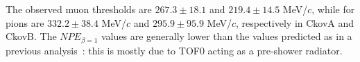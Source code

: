 The observed muon thresholds are $267.3\pm18.1$ and $219.4\pm14.5$ MeV/$c$, while for pions are $332.2\pm38.4$ MeV/$c$ and $295.9\pm95.9$ MeV/$c$, respectively in CkovA and CkovB. The $NPE_{\beta=1}$ values are generally lower than the values predicted as in a previous analysis~\cite{NOTE473}: this is mostly due to TOF0 acting as a pre-shower radiator.


